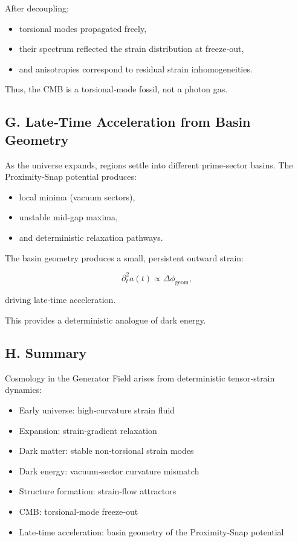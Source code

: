 \documentclass[reprint,amsmath,amssymb,aps,prl,floatfix]{revtex4-2}
\begin{document}
\begin{itemize}
After decoupling:
\begin{itemize}
\item torsional modes propagated freely,  
\item their spectrum reflected the strain distribution at freeze‑out,  
\item and anisotropies correspond to residual strain inhomogeneities.
\end{itemize}

Thus, the CMB is a torsional‑mode fossil, not a photon gas.

\subsection{G. Late‑Time Acceleration from Basin Geometry}

As the universe expands, regions settle into different prime‑sector basins.  
The Proximity‑Snap potential produces:

\begin{itemize}
\item local minima (vacuum sectors),  
\item unstable mid‑gap maxima,  
\item and deterministic relaxation pathways.
\end{itemize}

The basin geometry produces a small, persistent outward strain:

\[
\partial_t^2 a(t)
\propto
\Delta \phi_{\mathrm{geom}},
\]

driving late‑time acceleration.
\medskip

This provides a deterministic analogue of dark energy.

\subsection{H. Summary}

Cosmology in the Generator Field arises from deterministic tensor‑strain dynamics:
\begin{itemize}
\item Early universe: high‑curvature strain fluid  
\item Expansion: strain‑gradient relaxation  
\item Dark matter: stable non‑torsional strain modes  
\item Dark energy: vacuum‑sector curvature mismatch  
\item Structure formation: strain‑flow attractors  
\item CMB: torsional‑mode freeze‑out  
\item Late‑time acceleration: basin geometry of the Proximity‑Snap potential
\end{itemize}


\end{itemize}
\end{document}
